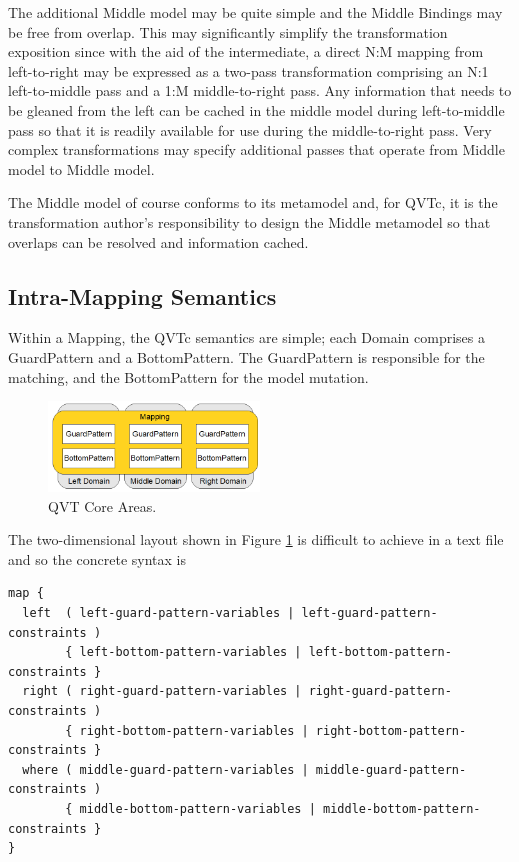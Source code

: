 The additional Middle model may be quite simple and the Middle Bindings may be free from overlap. This may significantly simplify the transformation exposition since with the aid of the intermediate, a direct N:M mapping from left-to-right may be expressed as a two-pass transformation comprising an N:1 left-to-middle pass and a 1:M middle-to-right pass. Any information that needs to be gleaned from the left can be cached in the middle model during left-to-middle pass so that it is readily available for use during the middle-to-right pass. Very complex transformations may specify additional passes that operate from Middle model to Middle model.

The Middle model of course conforms to its metamodel and, for QVTc, it is the transformation author's responsibility to design the Middle metamodel so that overlaps can be resolved and information cached. %

\subsection{Intra-Mapping Semantics}

Within a Mapping, the QVTc semantics are simple; each Domain comprises a GuardPattern and a BottomPattern. The GuardPattern is responsible for the matching, and the BottomPattern for the model mutation. 

\begin{figure}[h]
	\centering
	\includegraphics[width=0.5\textwidth]{QVTcoreAreas.png}
	\caption{QVT Core Areas.}
	\label{fig:QVTCoreAreas}
\end{figure}

The two-dimensional layout shown in Figure \ref{fig:QVTCoreAreas} is difficult to achieve in a text file and so the concrete syntax is

{\scriptsize \begin{verbatim}
map {
  left  ( left-guard-pattern-variables | left-guard-pattern-constraints )
        { left-bottom-pattern-variables | left-bottom-pattern-constraints }
  right ( right-guard-pattern-variables | right-guard-pattern-constraints )
        { right-bottom-pattern-variables | right-bottom-pattern-constraints }
  where ( middle-guard-pattern-variables | middle-guard-pattern-constraints )
        { middle-bottom-pattern-variables | middle-bottom-pattern-constraints }
}
\end{verbatim}}

